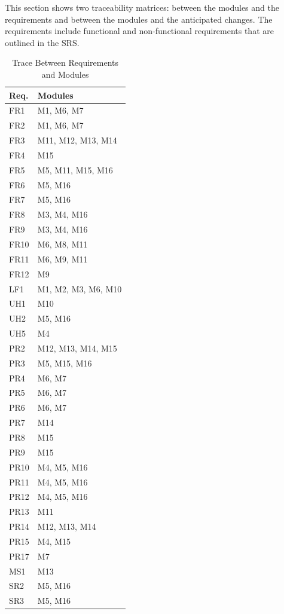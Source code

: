 \documentclass[12pt, titlepage]{article}
\begin{document}
This section shows two traceability matrices: between the modules and the
requirements and between the modules and the anticipated changes. The requirements include functional and non-functional requirements that are outlined in the SRS.

\begin{table}[H]
\centering
\begin{tabular}{p{} p{}}
\toprule
\textbf{Req.} & \textbf{Modules}\\
\midrule
FR1 & M1, M6, M7\\
FR2 & M1, M6, M7\\
FR3 & M11, M12, M13, M14\\
FR4 & M15\\
FR5 & M5, M11, M15, M16\\
FR6 & M5, M16\\
FR7 & M5, M16\\
FR8 & M3, M4, M16 \\
FR9 & M3, M4, M16 \\
FR10 & M6, M8, M11\\
FR11 & M6, M9, M11 \\
FR12 & M9\\
LF1 & M1, M2, M3, M6, M10\\
UH1 & M10\\
UH2 & M5, M16\\
UH5 & M4\\
PR2 & M12, M13, M14, M15\\
PR3 & M5, M15, M16\\
PR4 & M6, M7\\
PR5 & M6, M7\\
PR6 & M6, M7\\
PR7 & M14\\
PR8 & M15\\
PR9 & M15\\
PR10 & M4, M5, M16\\
PR11 & M4, M5, M16\\
PR12 & M4, M5, M16\\
PR13 & M11\\
PR14 & M12, M13, M14\\
PR15 & M4, M15\\
PR17 & M7\\
MS1 & M13\\
SR2 & M5, M16\\
SR3 & M5, M16\\


\bottomrule
\end{tabular}
\caption{Trace Between Requirements and Modules}
\label{TblRT}
\end{table}
\end{document}
